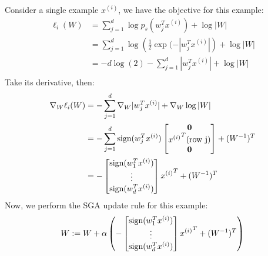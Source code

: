 \begin{answer}
Consider a single example $x^{(i)}$, we have the objective for this example:
\begin{align}
	\ell_i(W) &= \sum_{j=1}^{d} \log p_s(w_j^T x^{(i)}) + \log|W| \\
	&= \sum_{j=1}^{d} \log\left(\frac{1}{2}\exp(-|w_j^T x^{(i)}|\right) + \log|W| \\
	&= -d\log(2) - \sum_{j=1}^{d}|w_j^T x^{(i)}| + \log|W| \\
\end{align}
Take its derivative, then:
\begin{align}
	\nabla_W\ell_i(W) &= -\sum_{j=1}^{d}\nabla_W|w_j^T x^{(i)}| + \nabla_W\log|W| \\
	&= -\sum_{j=1}^{d}\text{sign}(w_j^T x^{(i)}) 
	\begin{bmatrix}
		\textbf{0} \\
		{x^{(i)}}^T\text{(row j)} \\
		\textbf{0} \\ 
	\end{bmatrix} 
	+ (W^{-1})^T \\
	&=
	-\begin{bmatrix}
		\text{sign}(w_1^T x^{(i)}) \\
		\vdots \\
		\text{sign}(w_d^T x^{(i)}) \\
	\end{bmatrix}{x^{(i)}}^T + (W^{-1})^T	
\end{align}
Now, we perform the SGA update rule for this example: 
$$W := W + \alpha\left( 
-\begin{bmatrix}
	\text{sign}(w_1^T x^{(i)}) \\
	\vdots \\
	\text{sign}(w_d^T x^{(i)}) \\
\end{bmatrix}{x^{(i)}}^T + (W^{-1})^T \right)$$
\end{answer}
